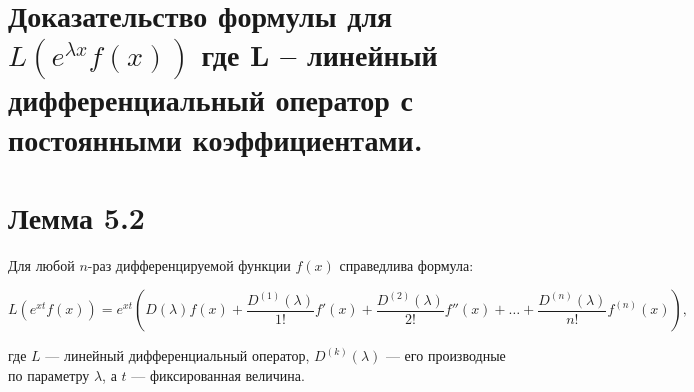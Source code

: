 {
	\section{Доказательство формулы для $L(e^{\lambda x}f(x))$\,\,где L – линейный дифференциальный оператор с постоянными
	коэффициентами.}

	\section*{Лемма 5.2}

	Для любой \( n \)-раз дифференцируемой функции \( f(x) \) справедлива формула:


	\[
	L\left(e^{xt} f(x)\right) = e^{xt} \left(D(\lambda)f(x)  + \frac{D^{(1)}(\lambda)}{1!} f'(x) + \frac{D^{(2)}(\lambda)}{2!} f''(x) + \ldots + \frac{D^{(n)}(\lambda)}{n!} f^{(n)}(x) \right),
	\]


	где \( L \) — линейный дифференциальный оператор, \( D^{(k)}(\lambda) \) — его производные по параметру \( \lambda \), а \( t \) — фиксированная величина.


	\newpage
} 